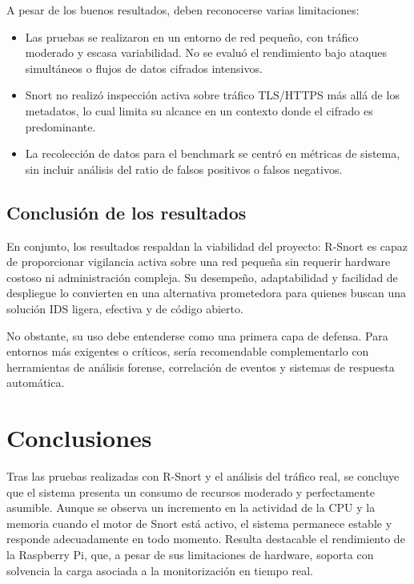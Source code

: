\documentclass[11pt,a4paper,twoside]{report}
\begin{document}
A pesar de los buenos resultados, deben reconocerse varias limitaciones:

\begin{itemize}
	\item Las pruebas se realizaron en un entorno de red pequeño, con tráfico moderado y escasa variabilidad. No se evaluó el rendimiento bajo ataques simultáneos o flujos de datos cifrados intensivos.
	\item Snort no realizó inspección activa sobre tráfico TLS/HTTPS más allá de los metadatos, lo cual limita su alcance en un contexto donde el cifrado es predominante.
	\item La recolección de datos para el benchmark se centró en métricas de sistema, sin incluir análisis del ratio de falsos positivos o falsos negativos.
\end{itemize}

\section{Conclusión de los resultados}

En conjunto, los resultados respaldan la viabilidad del proyecto: R-Snort es capaz de proporcionar vigilancia activa sobre una red pequeña sin requerir hardware costoso ni administración compleja. Su desempeño, adaptabilidad y facilidad de despliegue lo convierten en una alternativa prometedora para quienes buscan una solución IDS ligera, efectiva y de código abierto.\newline

No obstante, su uso debe entenderse como una primera capa de defensa. Para entornos más exigentes o críticos, sería recomendable complementarlo con herramientas de análisis forense, correlación de eventos y sistemas de respuesta automática.


\chapter*{Conclusiones}

Tras las pruebas realizadas con R-Snort y el análisis del tráfico real, se concluye que el sistema presenta un consumo de recursos moderado y perfectamente asumible. Aunque se observa un incremento en la actividad de la CPU y la memoria cuando el motor de Snort está activo, el sistema permanece estable y responde adecuadamente en todo momento. Resulta destacable el rendimiento de la Raspberry Pi, que, a pesar de sus limitaciones de hardware, soporta con solvencia la carga asociada a la monitorización en tiempo real.\newline
\end{document}
